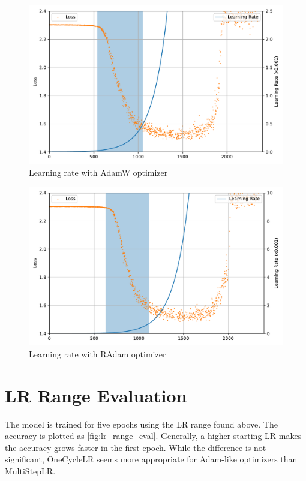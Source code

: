 \documentclass{article}
\begin{document}
\begin{figure}[ht!]
    \centering
    \includegraphics[scale=0.64]{images/lr_range_adamw.pdf}
    \caption{Learning rate with AdamW optimizer}\label{fig:lr_range_adamw}
\end{figure}

\begin{figure}[ht!]
    \centering
    \includegraphics[scale=0.64]{images/lr_range_radam.pdf}
    \caption{Learning rate with RAdam optimizer}\label{fig:lr_range_radam}
\end{figure}

\clearpage

\section{LR Range Evaluation}

The model is trained for five epochs using the LR range found above. The accuracy is plotted as \autoref{fig:lr_range_eval}.
Generally, a higher starting LR makes the accuracy grows faster in the first epoch.
While the difference is not significant, OneCycleLR seems more appropriate for Adam-like optimizers than MultiStepLR.
\end{document}
